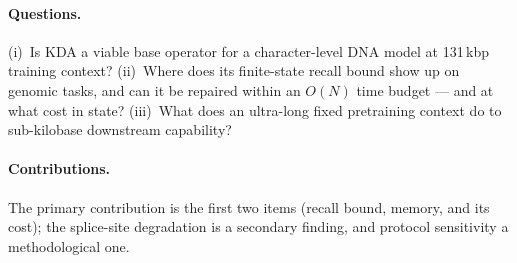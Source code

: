 \documentclass[11pt]{article}
\theoremstyle{plain}
\begin{document}
\paragraph{Questions.} (i)~Is KDA a viable base operator for a character-level DNA model at
131\,kbp training context? (ii)~Where does its finite-state recall bound show up on genomic tasks,
and can it be repaired within an $O(N)$ time budget --- and at what cost in state? (iii)~What does
an ultra-long fixed pretraining context do to sub-kilobase downstream capability?

\paragraph{Contributions.} The primary contribution is the first two items (recall bound, memory,
and its cost); the splice-site degradation is a secondary finding, and protocol sensitivity a
methodological one.
\end{document}
